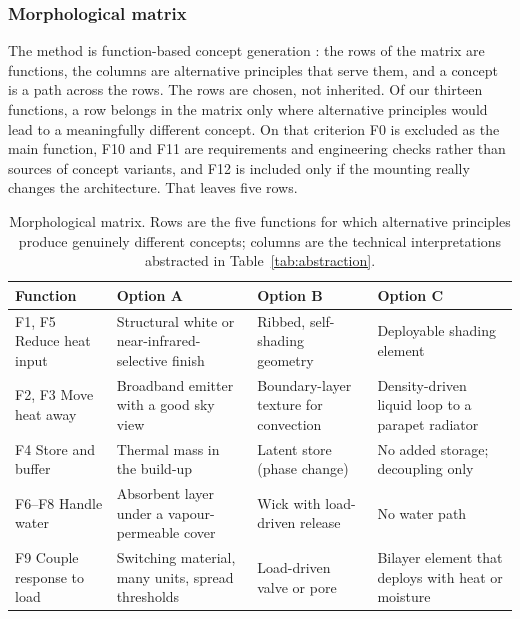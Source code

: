 \subsubsection{Morphological matrix}

The method is function-based concept generation \parencite{nagel2010}: the
rows of the matrix are functions, the columns are alternative principles that
serve them, and a concept is a path across the rows. The rows are chosen, not
inherited. Of our thirteen functions, a row belongs in
the matrix only where alternative principles would lead to a meaningfully
different concept. On that criterion F0 is excluded as the main function, F10 and
F11 are requirements and engineering checks rather than sources of concept
variants, and F12 is included only if the mounting really changes the
architecture. That leaves five rows.

\begin{table}[htbp]
\centering
\caption{Morphological matrix. Rows are the five functions for which
alternative principles produce genuinely different concepts; columns are the
technical interpretations abstracted in Table~\ref{tab:abstraction}.}
\label{tab:morph}
\renewcommand{\arraystretch}{1.3}
\small
\begin{tabularx}{\textwidth}{L{3.4cm} X X X}
\toprule
\textbf{Function} & \textbf{Option A} & \textbf{Option B} & \textbf{Option C} \\
\midrule
F1, F5 \newline Reduce heat input
& Structural white or near-infrared-selective finish
& Ribbed, self-shading geometry
& Deployable shading element \\
F2, F3 \newline Move heat away
& Broadband emitter with a good sky view
& Boundary-layer texture for convection
& Density-driven liquid loop to a parapet radiator \\
F4 \newline Store and buffer
& Thermal mass in the build-up
& Latent store (phase change)
& No added storage; decoupling only \\
F6--F8 \newline Handle water
& Absorbent layer under a vapour-permeable cover
& Wick with load-driven release
& No water path \\
F9 \newline Couple response to load
& Switching material, many units, spread thresholds
& Load-driven valve or pore
& Bilayer element that deploys with heat or moisture \\
\bottomrule
\end{tabularx}
\end{table}


